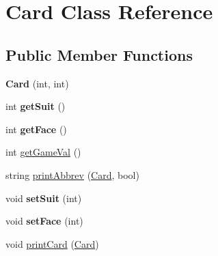 \hypertarget{class_card}{\section{Card Class Reference}
\label{class_card}
}
\subsection*{Public Member Functions}
\begin{DoxyCompactItemize}
\item 
\hypertarget{class_card_aad945a195000dceb03adfa9980c846ad}{{\bfseries Card} (int, int)}\label{class_card_aad945a195000dceb03adfa9980c846ad}

\item 
\hypertarget{class_card_ad82a99d71c4659f9ff66a716151ef910}{int {\bfseries get\+Suit} ()}\label{class_card_ad82a99d71c4659f9ff66a716151ef910}

\item 
\hypertarget{class_card_a8538ea5ba2f7e9889719f6bad587a22a}{int {\bfseries get\+Face} ()}\label{class_card_a8538ea5ba2f7e9889719f6bad587a22a}

\item 
int \hyperlink{class_card_af5dac040b788a9630d9e72ad490dcd26}{get\+Game\+Val} ()
\item 
string \hyperlink{class_card_a0c7b8b3624b37a1c347745a90e985965}{print\+Abbrev} (\hyperlink{class_card}{Card}, bool)
\item 
\hypertarget{class_card_a6ccd6088377ab1171aa647f987eeeaaf}{void {\bfseries set\+Suit} (int)}\label{class_card_a6ccd6088377ab1171aa647f987eeeaaf}

\item 
\hypertarget{class_card_a9cb8f841e5c6a981336d1814b6569a12}{void {\bfseries set\+Face} (int)}\label{class_card_a9cb8f841e5c6a981336d1814b6569a12}

\item 
void \hyperlink{class_card_a5fdb67ed250c91dfdec6cfff67d95648}{print\+Card} (\hyperlink{class_card}{Card})
\end{DoxyCompactItemize}


